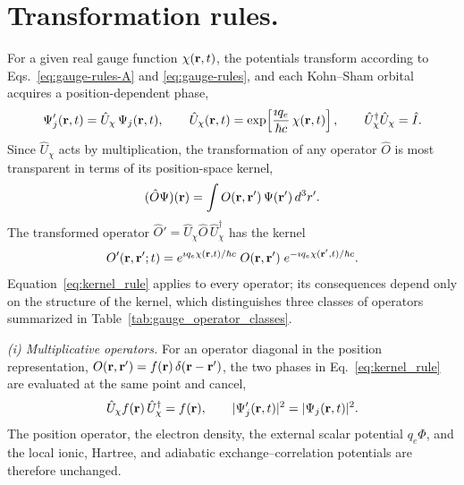 \section{ Transformation rules.}
\label{app:gauge_rules}

For a given real gauge function $\chi(\vb{r},t)$, the potentials transform
according to Eqs.~\eqref{eq:gauge-rules-A} and \eqref{eq:gauge-rules},
and each Kohn--Sham orbital acquires a position-dependent phase,
\begin{equation}
  \Psi_j'(\vb{r},t) = \hat U_\chi\,\Psi_j(\vb{r},t),
  \qquad
  \hat U_\chi(\vb{r},t) = \exp\!\left[\frac{\imath q_e}{\hbar c}\,\chi(\vb{r},t)\right],
  \qquad
  \hat U_\chi^\dagger\hat U_\chi = \hat I .
  \label{eq:orbital_rule}
\end{equation}
Since $\hat U_\chi$ acts by multiplication, the transformation of any operator
$\hat O$ is most transparent in terms of its position-space kernel,
\begin{equation}
  (\hat O\Psi)(\vb{r}) = \int O(\vb{r},\vb{r}')\,\Psi(\vb{r}')\,d^3r' .
  \nonumber
\end{equation}
The transformed operator $\hat O' = \hat U_\chi\hat O\,\hat U_\chi^\dagger$ has
the kernel
\begin{equation}
  O'(\vb{r},\vb{r}';t)
  = e^{\imath q_e\chi(\vb{r},t)/\hbar c}\;O(\vb{r},\vb{r}')\;
    e^{-\imath q_e\chi(\vb{r}',t)/\hbar c}.
  \label{eq:kernel_rule}
\end{equation}
Equation~\eqref{eq:kernel_rule} applies to every operator; its consequences
depend only on the structure of the kernel, which distinguishes three classes
of operators summarized in Table~\ref{tab:gauge_operator_classes}.

\emph{(i) Multiplicative operators.} For an operator diagonal in the position
representation, $O(\vb{r},\vb{r}') = f(\vb{r})\,\delta(\vb{r}-\vb{r}')$, the two
phases in Eq.~\eqref{eq:kernel_rule} are evaluated at the same point and cancel,
\begin{equation}
  \hat U_\chi f(\vb{r})\,\hat U_\chi^\dagger = f(\vb{r}),
  \qquad
  |\Psi_j'(\vb{r},t)|^2 = |\Psi_j(\vb{r},t)|^2 .
  \label{eq:local_rule}
\end{equation}
The position operator, the electron density, the external scalar potential
$q_e\Phi$, and the local ionic, Hartree, and adiabatic exchange--correlation
potentials are therefore unchanged.

